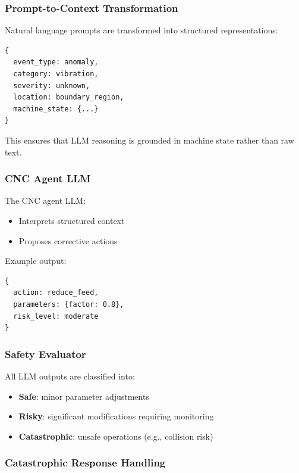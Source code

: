 \documentclass{article}
\begin{document}
\subsubsection{Prompt-to-Context Transformation}

Natural language prompts are transformed into structured representations:

\begin{verbatim}
{
  event_type: anomaly,
  category: vibration,
  severity: unknown,
  location: boundary_region,
  machine_state: {...}
}
\end{verbatim}

This ensures that LLM reasoning is grounded in machine state rather than raw text.

\subsubsection{CNC Agent LLM}

The CNC agent LLM:
\begin{itemize}
    \item Interprets structured context
    \item Proposes corrective actions
\end{itemize}

Example output:
\begin{verbatim}
{
  action: reduce_feed,
  parameters: {factor: 0.8},
  risk_level: moderate
}
\end{verbatim}

\subsubsection{Safety Evaluator}

All LLM outputs are classified into:

\begin{itemize}
    \item \textbf{Safe}: minor parameter adjustments
    \item \textbf{Risky}: significant modifications requiring monitoring
    \item \textbf{Catastrophic}: unsafe operations (e.g., collision risk)
\end{itemize}

\subsubsection{Catastrophic Response Handling}
\end{document}
